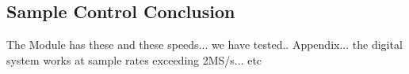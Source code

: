 \subsection{Sample Control Conclusion} \label{subsec:SampleControlConclusion} 



The Module has these and these speeds... we have tested.. Appendix... the digital system works at sample rates exceeding 2MS/s... etc